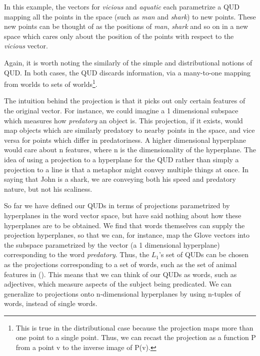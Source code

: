 \documentclass[10pt,letterpaper,twocolumn]{article}
\begin{document}
In this example, the vectors for \emph{vicious} and \emph{aquatic} each parametrize a QUD mapping all the points in the space (such as \emph{man} and \emph{shark}) to new points. These new points can be thought of as the positions of \emph{man}, \emph{shark} and so on in a new space which cares only about the position of the points with respect to the \emph{vicious} vector. 

Again, it is worth noting the similarly of the simple and distributional notions of QUD. In both cases, the QUD discards information, via a many-to-one mapping from worlds to sets of worlds\footnote{This is true in the distributional case because the projection  maps more than one point to a single point. Thus, we can recast the projection as a function P from a point v to the inverse image of P(v).}.

   


The intuition behind the projection is that it picks out only certain features of the original vector. For instance, we could imagine a 1 dimensional subspace which measures how \emph{predatory} an object is. This projection, if it exists, would map objects which are similarly predatory to nearby points in the space, and vice versa for points which differ in predatoriness. A higher dimensional hyperplane would care about n features, where n is the dimensionality of the hyperplane. The idea of using a projection to a hyperplane for the QUD rather than simply a projection to a line is that a metaphor might convey multiple things at once. In saying that John is a shark, we are conveying both his speed and predatory nature, but not his scaliness.

So far we have defined our QUDs in terms of projections parametrized by hyperplanes in the word vector space, but have said nothing about how these hyperplanes are to be obtained. We find that words themselves can supply the projection hyperplanes, so that we can, for instance, map the Glove vectors into the subspace parametrized by the vector (a 1 dimensional hyperplane) corresponding to the word \emph{predatory}. Thus, the $L_1$'s set of QUDs can be chosen as the projections corresponding to a set of words, such as the set of animal features in (\cite{kao}). This means that we can think of our QUDs as words, such as adjectives, which measure aspects of the subject being predicated. We can generalize to projections onto n-dimensional hyperplanes by using n-tuples of words, instead of single words.
\end{document}

